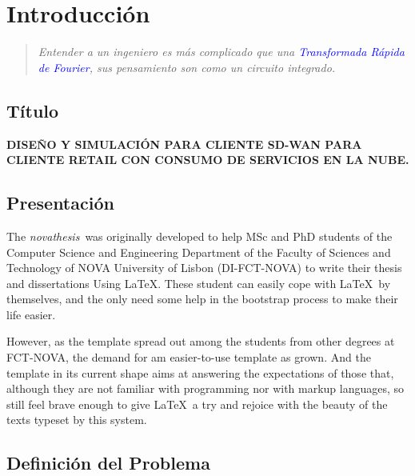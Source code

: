\newcommand{\novathesis}{\emph{novathesis}}
\newcommand{\novathesisclass}{\texttt{novathesis.cls}}


\chapter{Introducción}
\label{cha:Introducción}

\begin{quotation}
  \itshape
   Entender a un ingeniero es más complicado que una \textcolor{blue}{Transformada Rápida de Fourier},  sus pensamiento son como un circuito integrado.  
\end{quotation}

\section{Título} %
\label{sec:Título}

\textbf{DISEÑO Y SIMULACIÓN PARA CLIENTE SD-WAN PARA CLIENTE
RETAIL CON CONSUMO DE SERVICIOS EN LA NUBE.}
\section{Presentación} %
\label{sec:Presentación}

The \novathesis\ was originally developed to help MSc and PhD students of the Computer Science and Engineering Department of the Faculty of Sciences and Technology of NOVA University of Lisbon (DI-FCT-NOVA) to write their thesis and dissertations Using \LaTeX.
%
These student can easily cope with \LaTeX\ by themselves, and the only need some help in the bootstrap process to make their life easier.

However, as the template spread out among the students from other degrees at FCT-NOVA, the demand for am easier-to-use template as grown.
%
And the template in its current shape aims at answering the expectations of those that, although they are not familiar with programming nor with markup languages, so still feel brave enough to give \LaTeX\ a try and rejoice with the beauty of the texts typeset by this system.



\section{Definición del Problema} %
\label{sec:Definición del Problema}

